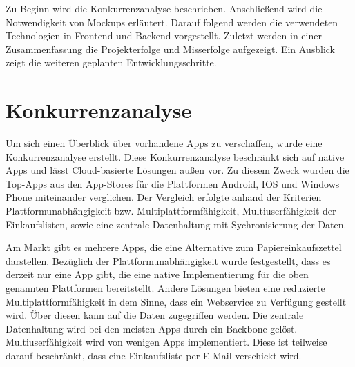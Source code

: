\documentclass[10pt, conference, compsocconf]{IEEEtran}
\begin{document}
Zu Beginn wird die Konkurrenzanalyse beschrieben. 
Anschließend wird die Notwendigkeit von Mockups erläutert. 
Darauf folgend werden die verwendeten Technologien in Frontend und Backend vorgestellt. 
Zuletzt werden in einer Zusammenfassung die Projekterfolge und Misserfolge aufgezeigt.
Ein Ausblick zeigt die weiteren geplanten Entwicklungsschritte.

\section{Konkurrenzanalyse}
Um sich einen \"Uberblick \"uber vorhandene Apps zu verschaffen, wurde eine Konkurrenzanalyse erstellt.
Diese Konkurrenzanalyse beschr\"ankt sich auf native Apps und l\"asst Cloud-basierte L\"osungen au{\ss}en vor.
Zu diesem Zweck wurden die Top-Apps aus den App-Stores f\"ur die Plattformen Android, IOS und Windows Phone miteinander verglichen.
Der Vergleich erfolgte anhand der Kriterien Plattformunabh\"angigkeit bzw. Multiplattformf\"ahigkeit, Multiuserf\"ahigkeit der Einkaufslisten, sowie eine zentrale Datenhaltung mit Sychronisierung der Daten.

Am Markt gibt es mehrere Apps, die eine Alternative zum Papiereinkaufszettel darstellen.
Bez\"uglich der Plattformunabh\"angigkeit wurde festgestellt, dass es derzeit nur eine App gibt, die eine native Implementierung f\"ur die oben genannten Plattformen bereitstellt. 
Andere L\"osungen bieten eine reduzierte Multiplattformf\"ahigkeit in dem Sinne, dass ein Webservice zu Verf\"ugung gestellt wird.
\"Über diesen kann auf die Daten zugegriffen werden.
Die zentrale Datenhaltung wird bei den meisten Apps durch ein Backbone gel\"ost.
Multiuserf\"ahigkeit wird von wenigen Apps implementiert. Diese ist teilweise darauf beschr\"ankt, dass eine Einkaufsliste per E-Mail verschickt wird.
\end{document}
